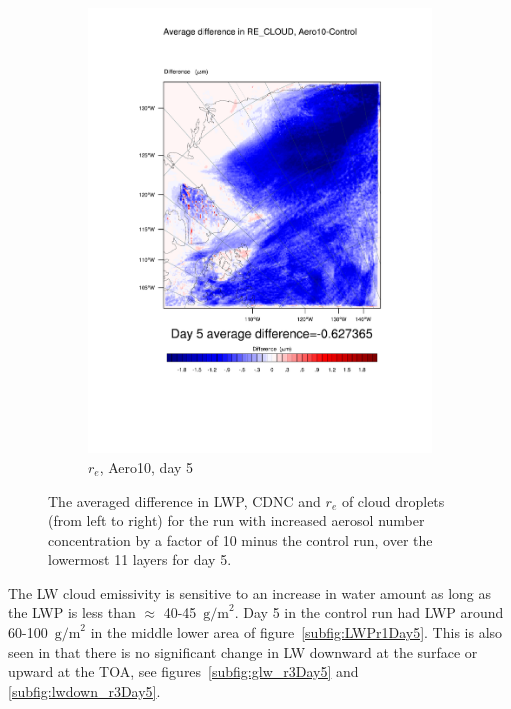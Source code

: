 \begin{figure}[h]
\begin{subfigure}{0.30\textwidth}
		\includegraphics[width=\textwidth]{results/aero10/diff_Aero10_RE_CLOUD_Day5.pdf}
		\caption{$r_e$, Aero10, day 5}
		\label{subfig:recloud_r3Day5}
	\end{subfigure}
\caption{The averaged difference in LWP, CDNC and $r_e$ of cloud droplets (from left to right) for the run with increased aerosol number concentration by a factor of 10 minus the control run, over the lowermost 11 layers for day 5.}
\label{fig:lwpcdncre_r3Day5}
\end{figure}
The LW cloud emissivity is sensitive to an increase in water amount as long as the LWP is less than $\approx$ 40-45~$\text{g/m}^2$. Day 5 in the control run had LWP around 60-100~$\text{g/m}^2$ in the middle lower area of figure~\ref{subfig:LWPr1Day5}.%
This is also seen in that there is no significant change in LW downward at the surface or upward at the TOA, see figures~\ref{subfig:glw_r3Day5} and \ref{subfig:lwdown_r3Day5}.
